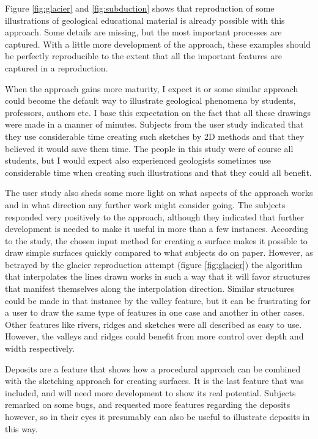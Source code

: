 \documentclass[a4paper,12pt]{report}
\begin{document}
Figure \ref{fig:glacier} and \ref{fig:subduction} shows that reproduction of some illustrations of geological educational material is already possible with this approach. Some details are missing, but the most important processes are captured. With a little more development of the approach, these examples should be perfectly reproducible to the extent that all the important features are captured in a reproduction.

When the approach gains more maturity, I expect it or some similar approach could become the default way to illustrate geological phenomena by students, professors, authors etc. I base this expectation on the fact that all these drawings were made in a manner of minutes. Subjects from the user study indicated that they use considerable time creating such sketches by 2D methods and that they believed it would save them time. The people in this study were of course all students, but I would expect also experienced geologists sometimes use considerable time when creating such illustrations and that they  could all benefit.

The user study also sheds some more light on what aspects of the approach works and in what direction any further work might consider going. The subjects responded very positively to the approach, although they indicated that further development is needed to make it useful in more than a few instances. According to the study, the chosen input method for creating a surface makes it possible to draw simple surfaces quickly compared to what subjects do on paper. However, as betrayed by the glacier reproduction attempt (figure \ref{fig:glacier}) the algorithm that interpolates the lines drawn works in such a way that it will favor structures that manifest themselves along the interpolation direction. Similar structures could be made in that instance by the valley feature, but it can be frustrating for a user to draw the same type of features in one case and another in other cases. Other features like rivers, ridges and sketches were all described as easy to use. However, the valleys and ridges could benefit from 
more control over depth and width respectively. 

Deposits are a feature that shows how a procedural approach can be combined with the sketching approach for creating surfaces. It is the last feature that was included, and will need more development to show its real potential. Subjects remarked on some bugs, and requested more features regarding the deposits however, so in their eyes it presumably can also be useful to illustrate deposits in this way. 
\end{document}

